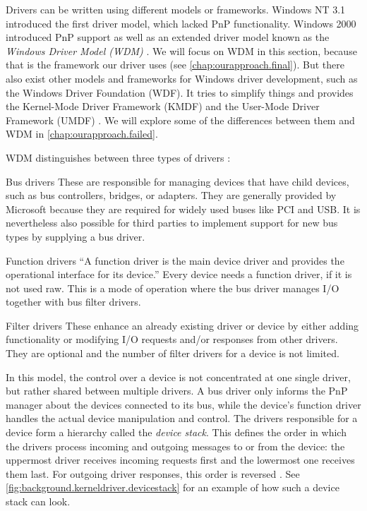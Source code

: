 Drivers can be written using different models or frameworks. Windows NT 3.1 introduced the first driver model, which lacked PnP functionality. Windows 2000 introduced PnP support as well as an extended driver model known as the \emph{Windows Driver Model (WDM)} \cite{Yosifovich2017}. We will focus on WDM in this section, because that is the framework our driver uses (see \autoref{chap:ourapproach.final}). But there also exist other models and frameworks for Windows driver development, such as the Windows Driver Foundation (WDF). It tries to simplify things and provides the Kernel-Mode Driver Framework (KMDF) and the User-Mode Driver Framework (UMDF) \cite{Yosifovich2017}. We will explore some of the differences between them and WDM in \autoref{chap:ourapproach.failed}.

WDM distinguishes between three types of drivers \cite{Yosifovich2017}:
\begin{descitemize}
	\item[Bus drivers] These are responsible for managing devices that have child devices, such as bus controllers, bridges, or adapters. They are generally provided by Microsoft because they are required for widely used buses like PCI and USB. It is nevertheless also possible for third parties to implement support for new bus types by supplying a bus driver.
	\item[Function drivers] ``A function driver is the main device driver and provides the operational interface for its device.'' \cite{Yosifovich2017} Every device needs a function driver, if it is not used raw. This is a mode of operation where the bus driver manages I/O together with bus filter drivers.
	\item[Filter drivers] These enhance an already existing driver or device by either adding functionality or modifying I/O requests and/or responses from other drivers. They are optional and the number of filter drivers for a device is not limited.
\end{descitemize}

In this model, the control over a device is not concentrated at one single driver, but rather shared between multiple drivers. A bus driver only informs the PnP manager about the devices connected to its bus, while the device's function driver handles the actual device manipulation and control. The drivers responsible for a device form a hierarchy called the \emph{device stack}. This defines the order in which the drivers process incoming and outgoing messages to or from the device: the uppermost driver receives incoming requests first and the lowermost one receives them last. For outgoing driver responses, this order is reversed \cite{Yosifovich2017}. See \autoref{fig:background.kerneldriver.devicestack} for an example of how such a device stack can look.


